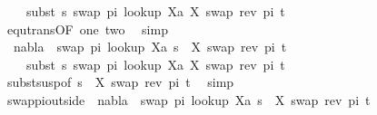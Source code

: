 \begin{isabellebody}
\ \ \ \ subst\ s\ {\isacharparenleft}{\kern0pt}swap\ pi\ {\isacharparenleft}{\kern0pt}look{\isacharunderscore}{\kern0pt}up\ Xa\ {\isacharbrackleft}{\kern0pt}{\isacharparenleft}{\kern0pt}X{\isacharcomma}{\kern0pt}\ swap\ {\isacharparenleft}{\kern0pt}rev\ pi{\isacharparenright}{\kern0pt}\ t{\isacharparenright}{\kern0pt}{\isacharbrackright}{\kern0pt}{\isacharparenright}{\kern0pt}{\isacharparenright}{\kern0pt}{\isachardoublequoteclose}\isanewline
\ \ \ \ \ \ \isamarkupfalse%
\ equ{\isacharunderscore}{\kern0pt}trans{\isacharbrackleft}{\kern0pt}OF\ one\ two{\isacharbrackright}{\kern0pt}\ \isamarkupfalse%
\ simp\isanewline
\ \ \ \ \isamarkupfalse%
\ \ {\isachardoublequoteopen}nabla\ {\isasymturnstile}\ swap\ pi\ {\isacharparenleft}{\kern0pt}look{\isacharunderscore}{\kern0pt}up\ Xa\ {\isacharparenleft}{\kern0pt}s\ {\isasymbullet}\ {\isacharbrackleft}{\kern0pt}{\isacharparenleft}{\kern0pt}X{\isacharcomma}{\kern0pt}\ swap\ {\isacharparenleft}{\kern0pt}rev\ pi{\isacharparenright}{\kern0pt}\ t{\isacharparenright}{\kern0pt}{\isacharbrackright}{\kern0pt}{\isacharparenright}{\kern0pt}{\isacharparenright}{\kern0pt}\ {\isasymapprox}\ \isanewline
\ \ \ \ subst\ s\ {\isacharparenleft}{\kern0pt}swap\ pi\ {\isacharparenleft}{\kern0pt}look{\isacharunderscore}{\kern0pt}up\ Xa\ {\isacharbrackleft}{\kern0pt}{\isacharparenleft}{\kern0pt}X{\isacharcomma}{\kern0pt}\ swap\ {\isacharparenleft}{\kern0pt}rev\ pi{\isacharparenright}{\kern0pt}\ t{\isacharparenright}{\kern0pt}{\isacharbrackright}{\kern0pt}{\isacharparenright}{\kern0pt}{\isacharparenright}{\kern0pt}{\isachardoublequoteclose}\isanewline
\ \ \ \ \ \ \isamarkupfalse%
\ subst{\isacharunderscore}{\kern0pt}susp{\isacharbrackleft}{\kern0pt}of\ {\isacartoucheopen}{\isacharparenleft}{\kern0pt}s\ {\isasymbullet}\ {\isacharbrackleft}{\kern0pt}{\isacharparenleft}{\kern0pt}X{\isacharcomma}{\kern0pt}\ swap\ {\isacharparenleft}{\kern0pt}rev\ pi{\isacharparenright}{\kern0pt}\ t{\isacharparenright}{\kern0pt}{\isacharbrackright}{\kern0pt}{\isacharparenright}{\kern0pt}{\isacartoucheclose}{\isacharbrackright}{\kern0pt}\ \isamarkupfalse%
\ simp\isanewline
\ \ \ \ \isamarkupfalse%
\ swap{\isacharunderscore}{\kern0pt}pi{\isacharunderscore}{\kern0pt}outside{\isacharcolon}{\kern0pt}\ \ {\isachardoublequoteopen}nabla\ {\isasymturnstile}\ swap\ pi\ {\isacharparenleft}{\kern0pt}look{\isacharunderscore}{\kern0pt}up\ Xa\ {\isacharparenleft}{\kern0pt}s\ {\isasymbullet}\ {\isacharbrackleft}{\kern0pt}{\isacharparenleft}{\kern0pt}X{\isacharcomma}{\kern0pt}\ swap\ {\isacharparenleft}{\kern0pt}rev\ pi{\isacharparenright}{\kern0pt}\ t{\isacharparenright}{\kern0pt}{\isacharbrackright}{\kern0pt}{\isacharparenright}{\kern0pt}{\isacharparenright}{\kern0pt}\ {\isasymapprox}\ \isanewline

\end{isabellebody}

